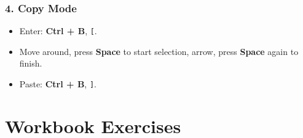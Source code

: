 \documentclass[a4paper]{report}
\begin{document}
    \subsubsection*{4. Copy Mode}
    \begin{itemize}
        \item Enter: \textbf{Ctrl + B}, \texttt{[}.
        \item Move around, press \textbf{Space} to start selection, arrow, press \textbf{Space} again to finish.
        \item Paste: \textbf{Ctrl + B}, \texttt{]}.
    \end{itemize}
    

    \section*{Workbook Exercises}
\end{document}

